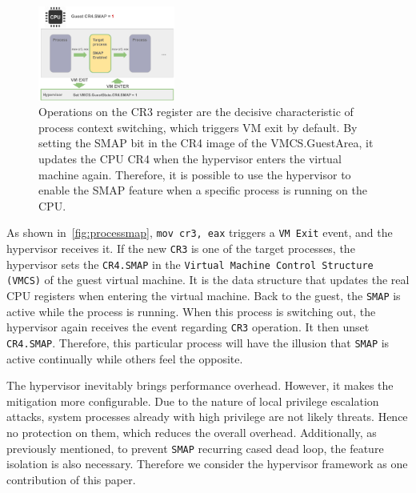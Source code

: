 \begin{figure}[th]
  \includegraphics[width=0.40\textwidth]{figures/processmap3}
  \centering
  \caption{Operations on the CR3 register are the decisive characteristic of process context switching, which triggers VM exit by default. By setting the SMAP bit in the CR4 image of the VMCS.GuestArea, it updates the CPU CR4 when the hypervisor enters the virtual machine again. Therefore, it is possible to use the hypervisor to enable the SMAP feature when a specific process is running on the CPU.}
  \label{fig:processmap}
\end{figure}


As shown in~\autoref{fig:processmap}, \texttt{mov cr3, eax} triggers a \texttt{VM Exit} event, and the hypervisor receives it. If the new \texttt{CR3} is one of the target processes, the hypervisor sets the \texttt{CR4.SMAP} in the \texttt{Virtual Machine Control Structure (VMCS)} of the guest virtual machine. It is the data structure that updates the real CPU registers when entering the virtual machine. Back to the guest, the \texttt{SMAP} is active while the process is running. When this process is switching out, the hypervisor again receives the event regarding \texttt{CR3} operation. It then unset \texttt{CR4.SMAP}. Therefore, this particular process will have the illusion that \texttt{SMAP} is active continually while others feel the opposite.

The hypervisor inevitably brings performance overhead. However, it makes the mitigation more configurable. Due to the nature of local privilege escalation attacks, system processes already with high privilege are not likely threats. Hence no protection on them, which reduces the overall overhead.  Additionally, as previously mentioned, to prevent \texttt{SMAP} recurring cased dead loop, the feature isolation is also necessary. Therefore we consider the hypervisor framework as one contribution of this paper.

